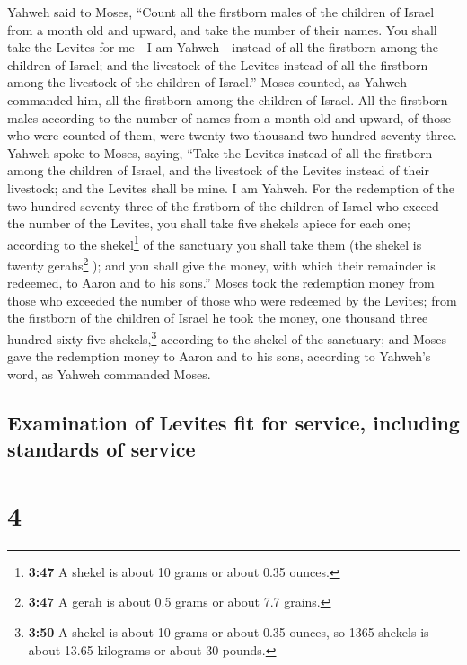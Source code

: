  Yahweh said to Moses, ``Count all the firstborn males of
the children of Israel from a month old and upward, and take the number
of their names.  You shall take the Levites for me---I am
Yahweh---instead of all the firstborn among the children of Israel; and
the livestock of the Levites instead of all the firstborn among the
livestock of the children of Israel.''  Moses counted, as
Yahweh commanded him, all the firstborn among the children of Israel.
 All the firstborn males according to the number of names
from a month old and upward, of those who were counted of them, were
twenty-two thousand two hundred seventy-three.  Yahweh
spoke to Moses, saying,  ``Take the Levites instead of
all the firstborn among the children of Israel, and the livestock of the
Levites instead of their livestock; and the Levites shall be mine. I am
Yahweh.  For the redemption of the two hundred
seventy-three of the firstborn of the children of Israel who exceed the
number of the Levites,  you shall take five shekels
apiece for each one; according to the shekel\footnote{\textbf{3:47} A
  shekel is about 10 grams or about 0.35 ounces.} of the sanctuary you
shall take them (the shekel is twenty gerahs\footnote{\textbf{3:47} A
  gerah is about 0.5 grams or about 7.7 grains.} );  and
you shall give the money, with which their remainder is redeemed, to
Aaron and to his sons.''  Moses took the redemption money
from those who exceeded the number of those who were redeemed by the
Levites;  from the firstborn of the children of Israel he
took the money, one thousand three hundred sixty-five
shekels,\footnote{\textbf{3:50} A shekel is about 10 grams or about 0.35
  ounces, so 1365 shekels is about 13.65 kilograms or about 30 pounds.}
according to the shekel of the sanctuary;  and Moses gave
the redemption money to Aaron and to his sons, according to Yahweh's
word, as Yahweh commanded Moses.

\hypertarget{examination-of-levites-fit-for-service-including-standards-of-service}{%
\subsection{Examination of Levites fit for service, including standards
of
service}\label{examination-of-levites-fit-for-service-including-standards-of-service}}

\hypertarget{section-3}{%
\section{4}\label{section-3}}

